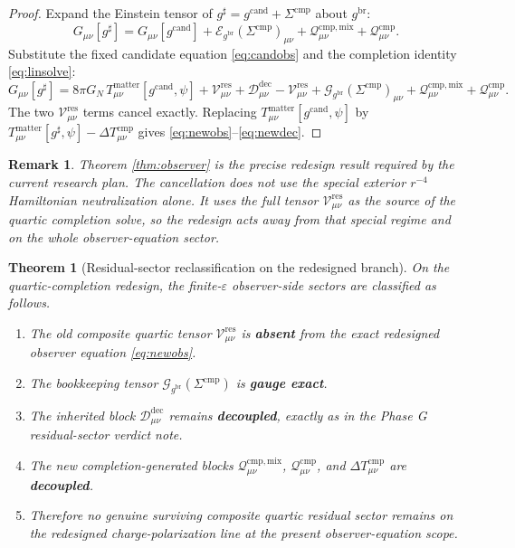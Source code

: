\documentclass[11pt]{article}
\newcommand{\ObserverMetric}{g^{\mathrm{br}}}
\newcommand{\CandidateMetric}{g^{\mathrm{cand}}}
\newcommand{\CompletedMetric}{g^{\sharp}}
\newcommand{\CompShift}{\Sigma^{\mathrm{cmp}}}
\newcommand{\DeltaTComp}{\Delta T_{\mu\nu}^{\mathrm{cmp}}}
\newcommand{\EinLin}{\mathcal E_{\ObserverMetric}}
\newcommand{\GaugeBook}{\mathcal G_{\ObserverMetric}}
\newcommand{\ResidualCore}{\mathcal V_{\mu\nu}^{\mathrm{res}}}
\newcommand{\ResidualDec}{\mathcal D_{\mu\nu}^{\mathrm{dec}}}
\newcommand{\CompMix}{\mathcal Q_{\mu\nu}^{\mathrm{cmp,mix}}}
\newcommand{\CompQuad}{\mathcal Q_{\mu\nu}^{\mathrm{cmp}}}
\newcommand{\epsIR}{\varepsilon}
\newtheorem{remark}{Remark}
\newtheorem{theorem}{Theorem}
\begin{document}
\begin{proof}
Expand the Einstein tensor of \(\CompletedMetric=\CandidateMetric+\CompShift\) about \(\ObserverMetric\):
\begin{equation}
G_{\mu\nu}[\CompletedMetric]
=
G_{\mu\nu}[\CandidateMetric]
+\EinLin(\CompShift)_{\mu\nu}
+\CompMix+\CompQuad.
\label{eq:expand}
\end{equation}
Substitute the fixed candidate equation \eqref{eq:candobs} and the completion identity \eqref{eq:linsolve}:
\[
G_{\mu\nu}[\CompletedMetric]
=
8\pi G_N\,T_{\mu\nu}^{\mathrm{matter}}[\CandidateMetric,\psi]
+\ResidualCore+\ResidualDec
-\ResidualCore
+\GaugeBook(\CompShift)_{\mu\nu}
+\CompMix+\CompQuad.
\]
The two \(\ResidualCore\) terms cancel exactly. Replacing \(T_{\mu\nu}^{\mathrm{matter}}[\CandidateMetric,\psi]\) by \(T_{\mu\nu}^{\mathrm{matter}}[\CompletedMetric,\psi]-\DeltaTComp\) gives \eqref{eq:newobs}--\eqref{eq:newdec}.
\end{proof}

\begin{remark}
Theorem \ref{thm:observer} is the precise redesign result required by the current research plan. The cancellation does not use the special exterior \(r^{-4}\) Hamiltonian neutralization alone. It uses the full tensor \(\ResidualCore\) as the source of the quartic completion solve, so the redesign acts away from that special regime and on the whole observer-equation sector.
\end{remark}

\begin{theorem}[Residual-sector reclassification on the redesigned branch]
\label{thm:class}
On the quartic-completion redesign, the finite-\(\epsIR\) observer-side sectors are classified as follows.
\begin{enumerate}
    \item The old composite quartic tensor \(\ResidualCore\) is \textbf{absent} from the exact redesigned observer equation \eqref{eq:newobs}.
    \item The bookkeeping tensor \(\GaugeBook(\CompShift)\) is \textbf{gauge exact}.
    \item The inherited block \(\ResidualDec\) remains \textbf{decoupled}, exactly as in the Phase G residual-sector verdict note.
    \item The new completion-generated blocks \(\CompMix\), \(\CompQuad\), and \(\DeltaTComp\) are \textbf{decoupled}.
    \item Therefore no genuine surviving composite quartic residual sector remains on the redesigned charge-polarization line at the present observer-equation scope.
\end{enumerate}
\end{theorem}
\end{document}
